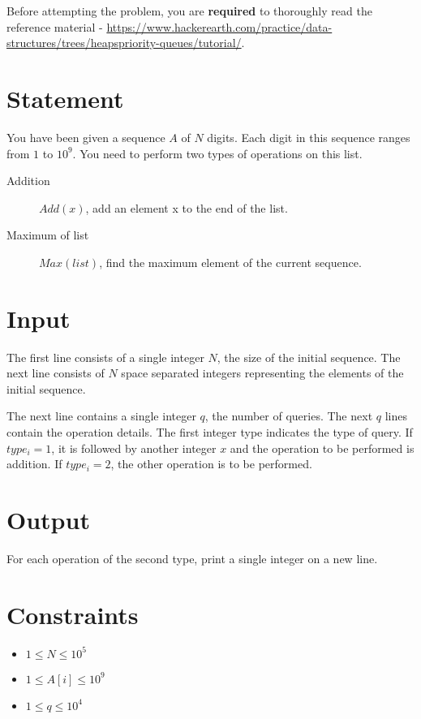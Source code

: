 \documentclass{article}
\begin{document}
Before attempting the problem, you are \textbf{required} to thoroughly read the reference material - \url{https://www.hackerearth.com/practice/data-structures/trees/heapspriority-queues/tutorial/}.

\section*{Statement}

You have been given a sequence $A$ of $N$ digits. Each digit in this sequence ranges from $1$ to $10^{9}$. You need to perform two types of operations on this list.

\begin{description}
    \item[Addition] $Add(x)$, add an element x to the end of the list.
    \item[Maximum of list] $Max(list)$, find the maximum element of the current sequence.
\end{description}

\section*{Input}

The first line consists of a single integer $N$, the size of the initial sequence. The next line consists of $N$ space separated integers representing the elements of the initial sequence.

The next line contains a single integer $q$, the number of queries. The next $q$ lines contain the operation details. The first integer type indicates the type of query. If $type_{i} = 1$, it is followed by another integer $x$ and the operation to be performed is addition. If $type_{i} = 2$, the other operation is to be performed.

\section*{Output}

For each operation of the second type, print a single integer on a new line. 

\section*{Constraints}

\begin{itemize}
    \item $1 \le N \le 10^{5}$
    \item $1 \le A[i] \le 10^{9}$
    \item $1 \le q \le 10^{4}$
\end{itemize}
\end{document}
